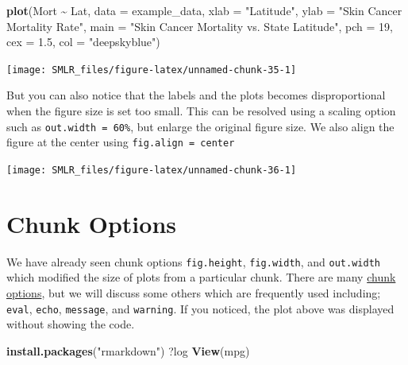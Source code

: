 \documentclass[
]{book}
\newenvironment{Shaded}{\begin{snugshade}}{\end{snugshade}}
\newcommand{\AttributeTok}[1]{\textcolor[rgb]{0.13,0.29,0.53}{#1}}
\newcommand{\DecValTok}[1]{\textcolor[rgb]{0.00,0.00,0.81}{#1}}
\newcommand{\FloatTok}[1]{\textcolor[rgb]{0.00,0.00,0.81}{#1}}
\newcommand{\FunctionTok}[1]{\textcolor[rgb]{0.13,0.29,0.53}{\textbf{#1}}}
\newcommand{\NormalTok}[1]{#1}
\newcommand{\SpecialCharTok}[1]{\textcolor[rgb]{0.81,0.36,0.00}{\textbf{#1}}}
\newcommand{\StringTok}[1]{\textcolor[rgb]{0.31,0.60,0.02}{#1}}
\theoremstyle{definition}
\theoremstyle{definition}
\theoremstyle{definition}
\theoremstyle{definition}
\theoremstyle{remark}
\begin{document}
\begin{Shaded}
\begin{Highlighting}[]
    \FunctionTok{plot}\NormalTok{(Mort }\SpecialCharTok{\textasciitilde{}}\NormalTok{ Lat, }\AttributeTok{data =}\NormalTok{ example\_data,}
         \AttributeTok{xlab =} \StringTok{"Latitude"}\NormalTok{,}
         \AttributeTok{ylab =} \StringTok{"Skin Cancer Mortality Rate"}\NormalTok{,}
         \AttributeTok{main =} \StringTok{"Skin Cancer Mortality vs. State Latitude"}\NormalTok{,}
         \AttributeTok{pch  =} \DecValTok{19}\NormalTok{,}
         \AttributeTok{cex  =} \FloatTok{1.5}\NormalTok{,}
         \AttributeTok{col  =} \StringTok{"deepskyblue"}\NormalTok{)}
\end{Highlighting}
\end{Shaded}

\begin{flushleft}\texttt{[image: SMLR\_files/figure-latex/unnamed-chunk-35-1]} \end{flushleft}

But you can also notice that the labels and the plots becomes disproportional when the figure size is set too small. This can be resolved using a scaling option such as \texttt{out.width\ =\ \textquotesingle{}60\%}, but enlarge the original figure size. We also align the figure at the center using \texttt{fig.align\ =\ \textquotesingle{}center\textquotesingle{}}

\begin{center}\texttt{[image: SMLR\_files/figure-latex/unnamed-chunk-36-1]} \end{center}

\hypertarget{chunk-options}{%
\section{Chunk Options}\label{chunk-options}}

We have already seen chunk options \texttt{fig.height}, \texttt{fig.width}, and \texttt{out.width} which modified the size of plots from a particular chunk. There are many \href{http://yihui.name/knitr/options/}{chunk options}, but we will discuss some others which are frequently used including; \texttt{eval}, \texttt{echo}, \texttt{message}, and \texttt{warning}. If you noticed, the plot above was displayed without showing the code.

\begin{Shaded}
\begin{Highlighting}[]
    \FunctionTok{install.packages}\NormalTok{(}\StringTok{"rmarkdown"}\NormalTok{)}
\NormalTok{    ?log}
    \FunctionTok{View}\NormalTok{(mpg)}
\end{Highlighting}
\end{Shaded}
\end{document}

